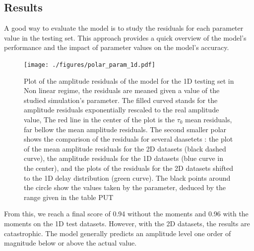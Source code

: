 \documentclass[11pt,a4paper,openany]{report}
\begin{document}
\begin{multicols}{2}
    \section{Results}
    A good way to evaluate the model is to study the residuals for each parameter value in the testing set. This approach provides a quick overview of the model's performance and the impact of parameter values on the model's accuracy.
    \begin{figure}[H]
        \texttt{[image: ./figures/polar\_param\_1d.pdf]}
        \caption{Plot of the amplitude residuals of the model for the 1D testing set in Non linear regime, the residuals are meaned given a value of the studied simulation's parameter. The filled curved stands for the amplitude residuals exponentially rescaled to the real amplitude value, The red line in the center of the plot is the $\tau_0$ mean residuals, far bellow the mean amplitude residuals. The second smaller polar shows the comparison of the residuals for several daasetets : the plot of the mean amplitude residuals for the 2D datasets (black dashed curve), the amplitude residuals for the 1D datasets (blue curve in the center), and the plots of the residuals for the 2D datasets shifted to the 1D delay distribution (green curve). The black points around the circle show the values taken by the parameter, deduced by the range given in the table PUT}
        \label{fig:polar_1d}
    \end{figure}
    From this, we reach a final score of 0.94 without the moments and 0.96 with the moments on the 1D test datasets. However, with the 2D datasets, the results are catastrophic. The model generally predicts an amplitude level one order of magnitude below or above the actual value.


\end{multicols}
\end{document}
